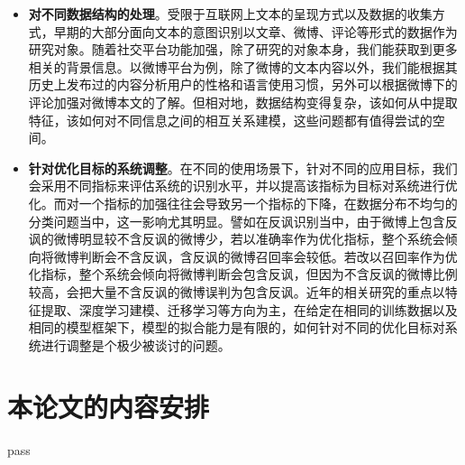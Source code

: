 \begin{itemize}

\item {\bf 对不同数据结构的处理}。受限于互联网上文本的呈现方式以及数据的收集方式，早期的大部分面向文本的意图识别以文章、微博、评论等形式的数据作为研究对象。随着社交平台功能加强，除了研究的对象本身，我们能获取到更多相关的背景信息。以微博平台为例，除了微博的文本内容以外，我们能根据其历史上发布过的内容分析用户的性格和语言使用习惯，另外可以根据微博下的评论加强对微博本文的了解。但相对地，数据结构变得复杂，该如何从中提取特征，该如何对不同信息之间的相互关系建模，这些问题都有值得尝试的空间。

\item {\bf 针对优化目标的系统调整}。在不同的使用场景下，针对不同的应用目标，我们会采用不同指标来评估系统的识别水平，并以提高该指标为目标对系统进行优化。而对一个指标的加强往往会导致另一个指标的下降，在数据分布不均匀的分类问题当中，这一影响尤其明显。譬如在反讽识别当中，由于微博上包含反讽的微博明显较不含反讽的微博少，若以准确率作为优化指标，整个系统会倾向将微博判断会不含反讽，含反讽的微博召回率会较低。若改以召回率作为优化指标，整个系统会倾向将微博判断会包含反讽，但因为不含反讽的微博比例较高，会把大量不含反讽的微博误判为包含反讽。近年的相关研究的重点以特征提取、深度学习建模、迁移学习等方向为主，在给定在相同的训练数据以及相同的模型框架下，模型的拟合能力是有限的，如何针对不同的优化目标对系统进行调整是个极少被谈讨的问题。

\end{itemize}

\section{本论文的内容安排}

pass









